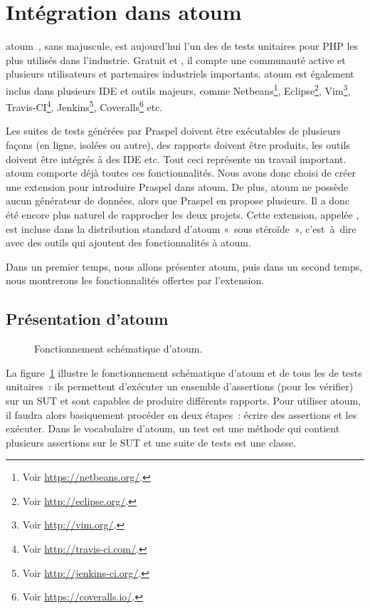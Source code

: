 \section{Intégration dans atoum}
\label{section:tools:atoum}

atoum~, sans majuscule, est aujourd'hui l'un des
 de tests unitaires pour PHP les plus utilisés dans
l'industrie. Gratuit et , il compte une communauté
active et plusieurs utilisateurs et partenaires industriels importants. atoum
est également inclus dans plusieurs IDE et outils majeurs, comme
Netbeans\footnote{Voir \url{https://netbeans.org/}.}, Eclipse\footnote{Voir
\url{http://eclipse.org/}.}, Vim\footnote{Voir \url{http://vim.org/}.},
Travis-CI\footnote{Voir \url{http://travis-ci.com/}.}, Jenkins\footnote{Voir
\url{http://jenkins-ci.org/}.}, Coveralls\footnote{Voir
\url{https://coveralls.io/}.} etc.

Les suites de tests générées par Praspel doivent être exécutables de plusieurs
façons (en ligne, isolées ou autre), des rapports doivent être produits, les
outils doivent être intégrés à des IDE etc. Tout ceci représente un travail
important. atoum comporte déjà toutes ces fonctionnalités. Nous avons donc
choisi de créer une extension pour introduire Praspel dans atoum. De plus, atoum
ne possède aucun générateur de données, alors que Praspel en propose plusieurs.
Il a donc été encore plus naturel de rapprocher les deux projets. Cette
extension, appelée , est incluse dans la
distribution standard d'atoum «~sous stéroïde~», c'est~à~dire avec des outils
qui ajoutent des fonctionnalités à atoum.

Dans un premier temps, nous allons présenter atoum, puis dans un second temps,
nous montrerons les fonctionnalités offertes par l'extension.

\subsection{Présentation d'atoum}

\begin{figure}


\caption{\label{figure:tools:atoum} Fonctionnement schématique d'atoum.}

\end{figure}

La figure~\ref{figure:tools:atoum} illustre le fonctionnement schématique
d'atoum et de tous les  de tests unitaires~: ils permettent
d'exécuter un ensemble d'assertions (pour les vérifier) sur un SUT et sont
capables de produire différents rapports. Pour utiliser atoum, il faudra alors
basiquement procéder en deux étapes~: écrire des assertions et les exécuter.
Dans le vocabulaire d'atoum, un test est une méthode qui contient plusieurs
assertions sur le SUT et une suite de tests est une classe.

